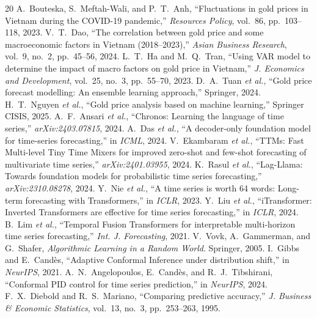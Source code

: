 \documentclass[conference]{IEEEtran}
\begin{document}
\begin{thebibliography}{20}
 A.~Bouteska, S.~Meftah-Wali, and P.~T.~Anh, ``Fluctuations in gold prices in Vietnam during the COVID-19 pandemic,'' \emph{Resources Policy}, vol.~86, pp.~103--118, 2023.
 V.~T.~Dao, ``The correlation between gold price and some macroeconomic factors in Vietnam (2018--2023),'' \emph{Asian Business Research}, vol.~9, no.~2, pp.~45--56, 2024.
 L.~T.~Ha and M.~Q.~Tran, ``Using VAR model to determine the impact of macro factors on gold price in Vietnam,'' \emph{J. Economics and Development}, vol.~25, no.~3, pp.~55--70, 2023.
 D.~A.~Tuan \emph{et al.}, ``Gold price forecast modelling: An ensemble learning approach,'' Springer, 2024.
 H.~T.~Nguyen \emph{et al.}, ``Gold price analysis based on machine learning,'' Springer CISIS, 2025.
 A.~F.~Ansari \emph{et al.}, ``Chronos: Learning the language of time series,'' \emph{arXiv:2403.07815}, 2024.
 A.~Das \emph{et al.}, ``A decoder-only foundation model for time-series forecasting,'' in \emph{ICML}, 2024.
 V.~Ekambaram \emph{et al.}, ``TTMs: Fast Multi-level Tiny Time Mixers for improved zero-shot and few-shot forecasting of multivariate time series,'' \emph{arXiv:2401.03955}, 2024.
 K.~Rasul \emph{et al.}, ``Lag-Llama: Towards foundation models for probabilistic time series forecasting,'' \emph{arXiv:2310.08278}, 2024.
 Y.~Nie \emph{et al.}, ``A time series is worth 64 words: Long-term forecasting with Transformers,'' in \emph{ICLR}, 2023.
 Y.~Liu \emph{et al.}, ``iTransformer: Inverted Transformers are effective for time series forecasting,'' in \emph{ICLR}, 2024.
 B.~Lim \emph{et al.}, ``Temporal Fusion Transformers for interpretable multi-horizon time series forecasting,'' \emph{Int. J. Forecasting}, 2021.
 V.~Vovk, A.~Gammerman, and G.~Shafer, \emph{Algorithmic Learning in a Random World}. Springer, 2005.
 I.~Gibbs and E.~Cand\`es, ``Adaptive Conformal Inference under distribution shift,'' in \emph{NeurIPS}, 2021.
 A.~N.~Angelopoulos, E.~Cand\`es, and R.~J.~Tibshirani, ``Conformal PID control for time series prediction,'' in \emph{NeurIPS}, 2024.
 F.~X.~Diebold and R.~S.~Mariano, ``Comparing predictive accuracy,'' \emph{J. Business \& Economic Statistics}, vol.~13, no.~3, pp.~253--263, 1995.

\end{thebibliography}
\end{document}
